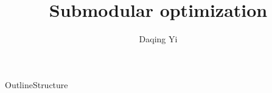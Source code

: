 \documentclass{beamer}
\title{Submodular optimization}
\author{ Daqing Yi }
\institute
{
  HCMI lab\\
  Brigham Young University
}
\date[]{}
\begin{document}
\begin{frame}
  \titlepage
\end{frame}

\begin{frame}{Outline}{Structure}
  \tableofcontents
\end{frame}

















\end{document}
